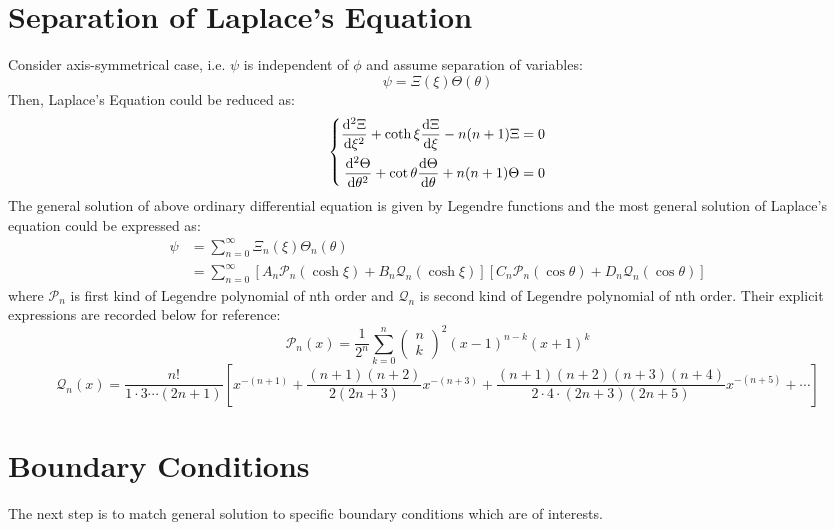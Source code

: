 \documentclass[fontsize=11pt, %
                             paper=a4, %
                             twoside, %
                             captions=tableheading,
                             index=totoc,
                             hyperref]{labbook}
\begin{document}
\begin{addmargin}[4cm]{0cm}
\section{Separation of Laplace's Equation}
Consider axis-symmetrical case, i.e. $\psi$ is independent of $\phi$ and assume separation of variables:
\begin{equation}
\psi=\Xi(\xi)\Theta(\theta)
\end{equation}
Then, Laplace's Equation could be reduced as:
\begin{equation}
\left\{
\begin{aligned}
\frac{\mathrm{d}^2 \Xi}{\mathrm{d} \xi^2}+\coth\xi\frac{\mathrm{d} \Xi}{\mathrm{d} \xi}-n(n+1)\Xi&=0\\
\frac{\mathrm{d}^2 \Theta}{\mathrm{d} \theta^2}+\cot\theta\frac{\mathrm{d} \Theta}{\mathrm{d} \theta}+n(n+1)\Theta&=0
\end{aligned}
\right.
\end{equation}
The general solution of above ordinary differential equation is given by Legendre functions and the most general solution of Laplace's equation could be expressed as\cite{MoonSpencer1988}:
\begin{equation}
\begin{aligned}
\psi&=\sum_{n=0}^\infty \Xi_n(\xi)\Theta_n(\theta)\\
&=\sum_{n=0}^\infty \left[A_n \mathscr{P}_n(\cosh\xi)+B_n \mathscr{Q}_n(\cosh\xi)\right]\left[C_n\mathscr{P}_n(\cos\theta)+D_n\mathscr{Q}_n(\cos\theta)\right]
\end{aligned}
\end{equation}
where $\mathscr{P}_n$ is first kind of Legendre polynomial of nth order and $\mathscr{Q}_n$ is second kind of Legendre polynomial of nth order. Their explicit expressions are recorded below for reference:
\begin{equation}
\mathscr{P}_n(x)=\frac{1}{2^n}\sum_{k=0}^n
\begin{pmatrix}
n\\
k
\end{pmatrix}^2
(x-1)^{n-k}(x+1)^k
\end{equation}
\begin{equation}
\mathscr{Q}_n(x)=\frac{n!}{1\cdot3\cdots(2n+1)}\left[x^{-(n+1)}+\frac{(n+1)(n+2)}{2(2n+3)}x^{-(n+3)}+\frac{(n+1)(n+2)(n+3)(n+4)}{2\cdot4\cdot(2n+3)(2n+5)}x^{-(n+5)}+\cdots\right]
\end{equation}
\section{Boundary Conditions}
The next step is to match general solution to specific boundary conditions which are of interests.

\end{addmargin}
\end{document}
